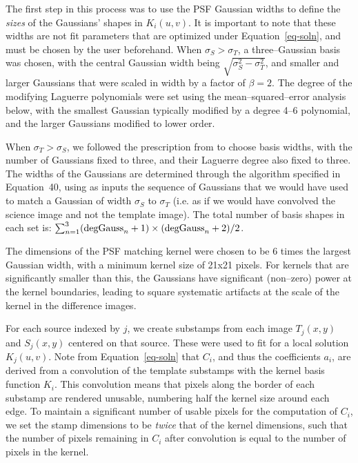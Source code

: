 \documentclass[floatfix, apj]{emulateapj}
\begin{document}
The first step in this process was to use the PSF Gaussian widths to define the {\it sizes} of the Gaussians' shapes in $K_i(u,v)$.
It is important to note that these widths are not fit parameters that are optimized under Equation~\ref{eq-soln}, and must be chosen by the user beforehand.
When $\sigma_S > \sigma_T$, a three--Gaussian basis was chosen, with the central Gaussian width being $\sqrt{\sigma_S^2 - \sigma_T^2}$, and smaller and larger Gaussians that were scaled in width by a factor of $\beta = 2$.
The degree of the modifying Laguerre polynomials were set using the mean--squared--error analysis below, with the smallest Gaussian typically modified by a degree 4--6 polynomial, and the larger Gaussians modified to lower order.

When $\sigma_T > \sigma_S$, we followed the prescription from \cite{0266-5611-26-8-085002} to choose basis widths, with the number of Gaussians fixed to three, and their Laguerre degree also fixed to three.
The widths of the Gaussians are determined through the algorithm specified in \cite{0266-5611-26-8-085002} Equation~40, using as inputs the sequence of Gaussians that we would have used to match a Gaussian of width $\sigma_S$ to $\sigma_T$ (i.e. as if we would have convolved the science image and not the template image).
The total number of basis shapes in each set is: $\sum_{n=1}^{3} ({\rm degGauss}_n+1)\times({\rm degGauss}_n+2)/2$.

The dimensions of the PSF matching kernel were chosen to be 6 times the largest Gaussian width, with a minimum kernel size of 21x21 pixels.
For kernels that are significantly smaller than this, the Gaussians have significant (non--zero) power at the kernel boundaries, leading to square systematic artifacts at the scale of the kernel in the difference images.

For each source indexed by $j$, we create substamps from each image $T_j(x,y)$ and $S_j(x,y)$ centered on that source.
These were used to fit for a local solution $K_j(u,v)$.
Note from Equation~\ref{eq-soln} that $C_i$, and thus the coefficients $a_i$, are derived from a convolution of the template substamps with the kernel basis function $K_i$.
This convolution means that pixels along the border of each substamp are rendered unusable, numbering half the kernel size around each edge.
To maintain a significant number of usable pixels for the computation of $C_i$, we set the stamp dimensions to be {\it twice} that of the kernel dimensions, such that the number of pixels remaining in $C_i$ after convolution is equal to the number of pixels in the kernel.
\end{document}
